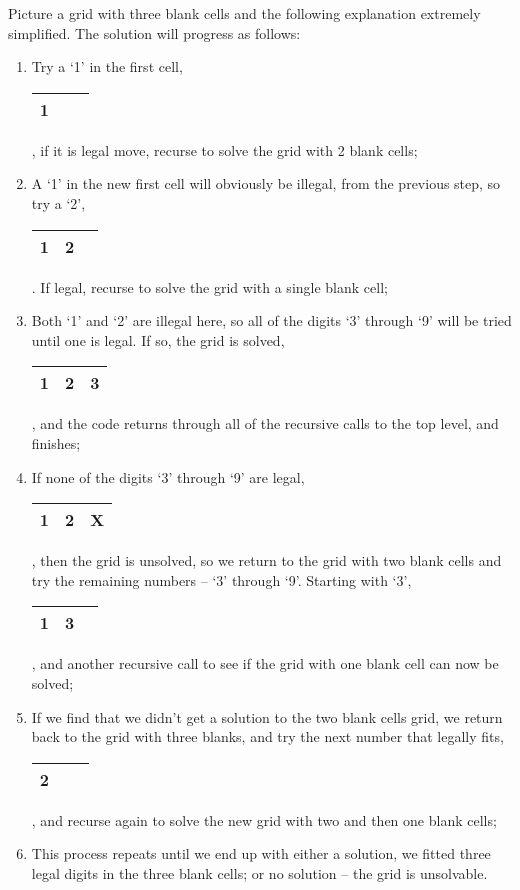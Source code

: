 Picture a grid with three blank cells and the following explanation
extremely simplified. The solution will progress as follows:
\begin{enumerate}
\item Try a `1' in the first cell, %
\begin{tabular}{|c|c|c|}
\hline 
1 &  & \tabularnewline
\hline 
\end{tabular}, if it is legal move, recurse to solve the grid with 2 blank cells;
\item A `1' in the new first cell will obviously be illegal, from the
previous step, so try a `2', %
\begin{tabular}{|c|c|c|}
\hline 
1 & 2 & \tabularnewline
\hline 
\end{tabular}. If legal, recurse to solve the grid with a single blank cell;
\item Both `1' and `2' are illegal here, so all of the digits `3'
through `9' will be tried until one is legal. If so, the grid is
solved, %
\begin{tabular}{|c|c|c|}
\hline 
1 & 2 & 3\tabularnewline
\hline 
\end{tabular}, and the code returns through all of the recursive calls to the top
level, and finishes;
\item If none of the digits `3' through `9' are legal, %
\begin{tabular}{|c|c|c|}
\hline 
1 & 2 & X\tabularnewline
\hline 
\end{tabular}, then the grid is unsolved, so we return to the grid with two blank
cells and try the remaining numbers -- `3' through `9'. Starting
with `3', %
\begin{tabular}{|c|c|c|}
\hline 
1 & 3 & \tabularnewline
\hline 
\end{tabular}, and another recursive call to see if the grid with one blank cell
can now be solved;
\item If we find that we didn't get a solution to the two blank cells grid,
we return back to the grid with three blanks, and try the next number
that legally fits, %
\begin{tabular}{|c|c|c|}
\hline 
2 &  & \tabularnewline
\hline 
\end{tabular}, and recurse again to solve the new grid with two and then one blank
cells;
\item This process repeats until we end up with either a solution, we fitted
three legal digits in the three blank cells; or no solution -- the
grid is unsolvable.
\end{enumerate}

